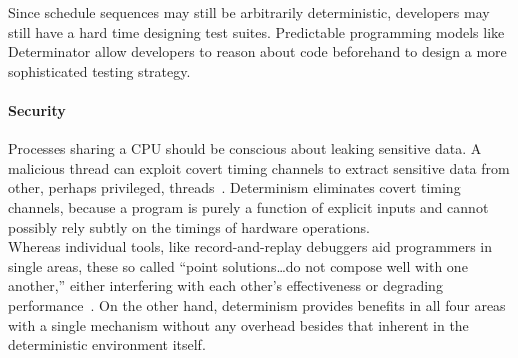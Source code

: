 Since schedule sequences may still be arbitrarily deterministic, developers may
still have a hard time designing test suites. Predictable programming models
like Determinator allow developers to reason about code beforehand
to design a more sophisticated testing strategy.

\paragraph{Security} Processes sharing a CPU should be
conscious about leaking sensitive data. A malicious thread can exploit covert
timing channels to extract sensitive data from other, perhaps privileged,
threads~\cite{Aviram10cloud}. Determinism eliminates covert timing channels,
because a program is purely a function of explicit inputs and cannot possibly
rely subtly on the timings of hardware operations.
\\

\iffalse
We also note the importance of repeatability in simulators.
Physicists rely on repeatability of simulated experiments to verify results,
and video game developers often benefit from repeatable physics engines.
\fi

Whereas individual tools, like record-and-replay debuggers aid programmers in
single areas, these so called ``point solutions\ldots do not compose well with
one another,'' either interfering with each other's
effectiveness or degrading performance~\cite{Bergan11}. On the other hand,
determinism provides benefits in all four areas with a single mechanism without
any overhead besides that inherent in the deterministic environment itself.

\iffalse
To further motivate determinism, we consider ``point solutions'' that
solve problems in single areas at
once. Record and replay debuggers, like Leblanc et al.'s Instant Replay
system, aid in debugging parallel programs by logging scheduling sequences and
other relevant interactions in order to replay an execution sequence exactly.
However, these debuggers are costly in terms of storage and performance.
\iffalse Even with replay ability, the execution sequence is still arbitrary and
gives the programmer no intuition about the program's behavior. \fi
In general, these ``point solutions\ldots do not compose well with one
another''~\cite{Bergan11}. On the other hand, determinism provides benefits in
all four areas at once with a single mechanism without any additional overhead
besides that inherent in the deterministic environment.
\fi

